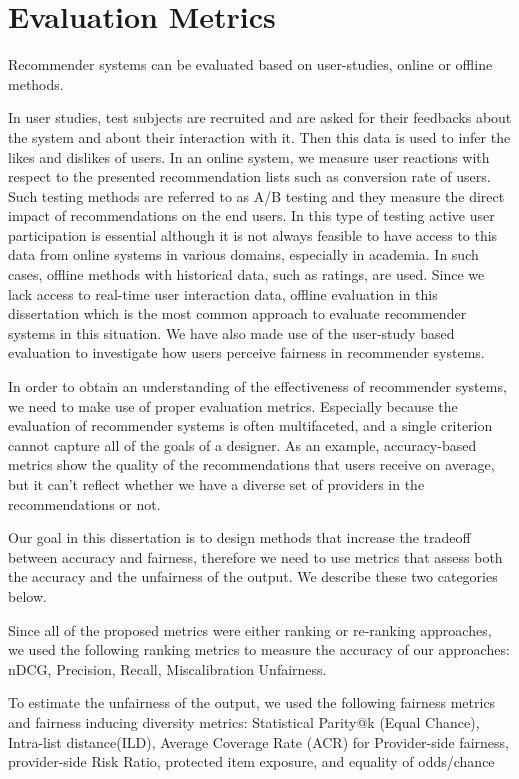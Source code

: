 \section{Evaluation Metrics}
\label{sec:eval}
    
    Recommender systems can be evaluated based on user-studies, online or offline methods.
    
    In user studies, test subjects are recruited and are asked for their feedbacks about the system and about their interaction with it. Then this data is used to infer the likes and dislikes of users. 
    In an online system, we measure user reactions with respect to the presented recommendation lists such as conversion rate of users. Such testing methods are referred to as A/B testing and they measure the direct impact of recommendations on the end users. In this type of testing active user participation is essential although it is not always feasible to have access to this data from online systems in various domains, especially in academia. In such cases, offline methods with historical data, such as ratings, are used. Since we lack access to real-time user interaction data, offline evaluation in this dissertation which is the most common approach to evaluate recommender systems in this situation. We have also made use of the user-study based evaluation to investigate  how users perceive fairness in recommender systems.
    
    In order to obtain an understanding of the effectiveness of recommender systems, we need to make use of proper evaluation metrics. Especially because the evaluation of recommender systems is often multifaceted, and a single criterion cannot capture all of the goals of a designer. As an example, accuracy-based metrics show the quality of the recommendations that users receive on average, but it can't reflect whether we have a diverse set of providers in the recommendations or not. 
    
    Our goal in this dissertation is to design methods that increase the tradeoff between accuracy and fairness, therefore we need to use metrics that assess both the accuracy and the unfairness of the output. We describe these two categories below.
    
    Since all of the proposed metrics were either ranking or re-ranking approaches, we used the following ranking metrics to measure the accuracy of our approaches: nDCG, Precision, Recall, Miscalibration Unfairness.
    
    To estimate the unfairness of the output, we used the following fairness metrics and fairness inducing diversity metrics: Statistical Parity@k (Equal Chance), Intra-list distance(ILD), Average Coverage Rate (ACR) for Provider-side fairness, provider-side Risk Ratio, protected item exposure, and equality of odds/chance
    

